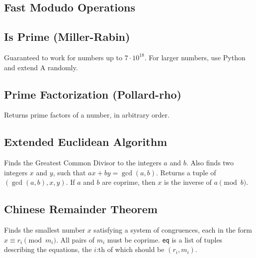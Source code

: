 \documentclass{article}
\begin{document}
\subsection*{Fast Modudo Operations}


\newpage

\subsection*{Is Prime (Miller-Rabin)}
Guaranteed to work for numbers up to $7 \cdot 10^{18}$. For larger numbers, use Python and extend A randomly.
\begin{multicols}{2}
  
  \columnbreak
  
\end{multicols}

\subsection*{Prime Factorization (Pollard-rho)}
Returns prime factors of a number, in arbitrary order.
\begin{multicols}{2}
  
  \columnbreak
  
\end{multicols}

\subsection*{Extended Euclidean Algorithm}
Finds the Greatest Common Divisor to the integers $a$ and $b$. Also finds two integers $x$ and $y$, such that $ax+by=\gcd(a,b)$.
Returns a tuple of $(\gcd(a, b), x, y)$. If $a$ and $b$ are coprime, then $x$ is the inverse of $a \pmod{b}$.
\begin{multicols}{2}
  
  \columnbreak
  
\end{multicols}

\subsection*{Chinese Remainder Theorem}
Finds the smallest number $x$ satisfying a system of congruences, each in the form $x \equiv r_i \pmod{m_i}$.
All pairs of $m_i$ must be coprime. \lstinline{eq} is a list of tuples describing the equations, the $i$:th of which should be $(r_i, m_i)$.
\begin{multicols}{2}
  
  \columnbreak
  
\end{multicols}
\end{document}
